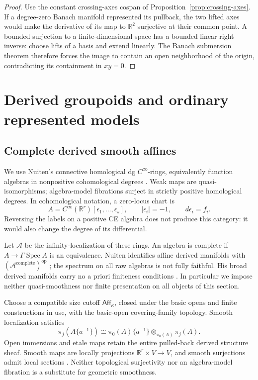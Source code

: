 \documentclass[12pt]{amsart}
\theoremstyle{definition}
\theoremstyle{remark}
\numberwithin{equation}{section}
\newcommand{\R}{\mathbb R}
\newcommand{\CA}{\mathcal A}
\newcommand{\Aff}{\mathsf{Aff}}
\newcommand{\op}{\mathrm{op}}
\DeclareMathOperator{\Spec}{Spec}
\begin{document}
\begin{proof}
Use the constant crossing-axes cospan of
Proposition~\ref{prop:crossing-axes}.
If a degree-zero Banach manifold represented
its pullback, the two lifted axes would make
the derivative of its map to $\R^2$ surjective
at their common point.
A bounded surjection to a finite-dimensional
space has a bounded linear right inverse:
choose lifts of a basis and extend linearly.
The Banach submersion theorem therefore
forces the image to contain an open
neighborhood of the origin, contradicting
its containment in $xy=0$.
\end{proof}

\section{Derived groupoids and ordinary represented models}
\label{sec:derived}

\subsection{Complete derived smooth affines}

We use Nuiten's connective
homological dg $C^\infty$-rings, equivalently function algebras in
nonpositive cohomological degrees
\cite[Definition~2.2.1 and Proposition~2.2.4, p.~22]{NuitenThesis2018}.
Weak maps are quasi-isomorphisms; algebra-model fibrations surject in
strictly positive homological degrees. In cohomological notation,
a zero-locus chart is
\[
 A=C^\infty(\R^r)[\epsilon_1,\ldots,\epsilon_s],
 \qquad |\epsilon_i|=-1,\qquad d\epsilon_i=f_i.
\]
Reversing the labels on a positive CE algebra does not produce this
category: it would also change the degree of its differential.

Let $\CA$ be the infinity-localization of these rings. An algebra
is complete if $A\to\Gamma\Spec A$ is an equivalence.
Nuiten identifies affine derived manifolds with
$(\CA^{\mathrm{complete}})^\op$
\cite[Corollary~5.1.28, p.~130]{NuitenThesis2018};
the spectrum on all raw algebras is not fully faithful.
His broad derived manifolds carry no a priori finiteness conditions
\cite[p.~121]{NuitenThesis2018}. In particular we impose neither
quasi-smoothness nor finite presentation on all objects of this section.

Choose a compatible size cutoff $\Aff_\kappa$, closed under the
basic opens and finite constructions in use, with the basic-open
covering-family topology. Smooth localization satisfies
\[
 \pi_j(A\{a^{-1}\})
 \cong \pi_0(A)\{a^{-1}\}\otimes_{\pi_0(A)}\pi_j(A).
\]
Open immersions and etale maps retain the entire pulled-back derived
structure sheaf. Smooth maps are locally projections
$\R^r\times V\to V$, and smooth surjections admit local sections
\cite[Definition~5.2.8 and Lemma~5.2.10,
pp.~135--137]{NuitenThesis2018}.
Neither topological surjectivity nor an algebra-model fibration
is a substitute for geometric smoothness.
\end{document}
